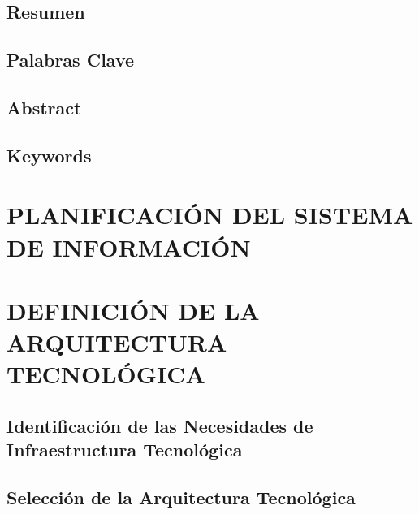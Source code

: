\documentclass[11pt]{report}
\begin{document}
\section{Resumen}


\section{Palabras Clave}


\section{Abstract}


\section{Keywords}
\newpage
\pagestyle{fancy}

\chapter{PLANIFICACIÓN DEL SISTEMA DE INFORMACIÓN}

\noindent{}
\newpage




\chapter{DEFINICIÓN DE LA ARQUITECTURA TECNOLÓGICA}
\noindent{}
\newpage

\section{Identificación de las Necesidades de Infraestructura Tecnológica} 

\newpage
\section{Selección de la Arquitectura Tecnológica} 
\end{document}
